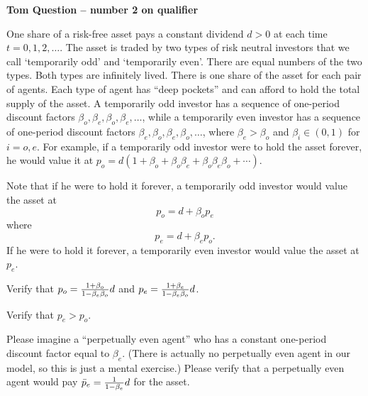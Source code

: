 

\book
\overfullrule=0pt
\def\frac#1#2{#1\over #2}
%
\def\bmatrix#1{\left[ \matrix{#1} \right]}
\def\be{{\beta}}
\def\toone{{t+1}}

\overfullrule=0pt

\centerline{\bf Tom Question -- number  2 on qualifier}
\medskip



 \quad 
\medskip


\noindent One share of a risk-free asset pays a constant dividend $d >0$ at each time $t = 0, 1, 2, \ldots$.  
The asset is traded by two types of risk neutral investors that we call  `temporarily odd' and `temporarily even'. There are equal numbers of the two types.
Both types are infinitely lived.  There is one share of the asset for each pair of agents.  Each type of agent has ``deep pockets'' and can afford to hold the total supply of the asset.  
A temporarily odd investor
has a sequence of one-period discount factors $\beta_o, \beta_e, \beta_o, \beta_e, \ldots $, while a temporarily  even investor
has a sequence of one-period discount factors   $\beta_e, \beta_o, \beta_e,  \beta_o, \ldots $, where $\beta_e > \beta_o$
and $\beta_i \in (0,1)$ for $i=o, e$. For example, if a temporarily odd investor were to hold the asset forever, he would value
it at $p_o = d( 1 + \beta_o + \beta_o \beta_e + \beta_o \beta_e \beta_o + \cdots )$.    

\medskip
{}

\medskip
\noindent   Note that if he were to hold it forever, a temporarily odd investor would value the asset at
$$ p_o = d + \beta_o p_e$$
where 
$$ p_e = d + \beta_e p_o .$$
If he were to hold it forever, a temporarily even investor would value the asset at 
$p_e$.  

\medskip
{} Verify that $p_o = {\frac{1 + \beta_o}{1-\beta_e \beta_o}} d $ and
$ p_e = {\frac{1 + \beta_e}{1-\beta_e \beta_o}} d $.

\medskip
{} Verify that $p_e > p_o$.


\medskip
{} Please imagine a  ``perpetually even agent'' who has a constant one-period discount factor equal to 
$\beta_e$.  (There is actually no perpetually even agent in our model, so this is just a mental exercise.)  Please verify
that a perpetually even agent would pay $\bar p_e = {\frac{1}{1-\beta_e}}d $ for the asset.    



